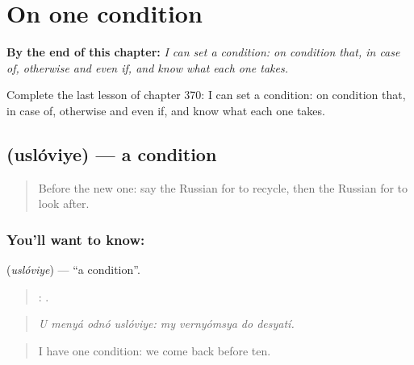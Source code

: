 
\chapter{On one condition}
\label{ch:ru-on-one-condition}

\begin{chapteropening}
\textbf{By the end of this chapter:} \emph{I can set a condition: on condition that, in case of, otherwise and even if, and know what each one takes.}

Complete the last lesson of chapter 370: I can set a condition: on condition that, in case of, otherwise and even if, and know what each one takes.
\end{chapteropening}

\section[\texorpdfstring{\ru{условие} (uslóviye)}{условие (uslóviye)}]{ (uslóviye) — a condition}

\label{lesson:RU-C370-uslovie}



\begin{quote}
Before the new one: say the Russian for to recycle, then the Russian for to look after.
\end{quote}

\subsection*{You'll want to know: }
\textbf{} (\emph{uslóviye}) — \textquotedblleft{}a condition\textquotedblright{}.

\begin{quote}
   :    .
\end{quote}

\begin{quote}
\emph{U menyá odnó uslóviye: my vernyómsya do desyatí.}
\end{quote}

\begin{quote}
I have one condition: we come back before ten.
\end{quote}

